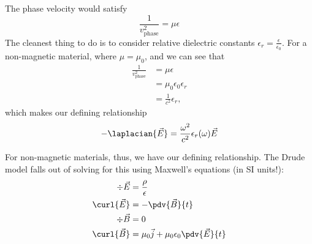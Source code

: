 \documentclass[../../main.tex]{subfiles}
\begin{document}
The phase velocity would satisfy 
\begin{equation}
	\frac{1}{v_{\textrm{phase}}^2} = \mu \epsilon
\end{equation}
The cleanest thing to do is to consider relative dielectric constants $\epsilon_r = \frac{\epsilon}{\epsilon_0}$. For a non-magnetic material, where $\mu = \mu_0$, and we can see that 
\begin{align}
	\frac{1}{v_{\textrm{phase}}^2} &= \mu \epsilon \\
	&= \mu_0 \epsilon_0 \epsilon_r \\
	&= \frac{1}{c^2} \epsilon_r,
\end{align}
which makes our defining relationship 
\begin{equation} \label{eq:DrudeTheory:DielectricDef}
	-\laplacian{\vec{E}} = \frac{\omega^2}{c^2} \epsilon_r(\omega) \vec{E}
\end{equation}

For non-magnetic materials, thus, we have our defining relationship. The Drude model falls out of solving for this using Maxwell's equations (in SI units!):
\begin{align}
	\div{\vec{E}} &= \frac{\rho}{\epsilon} \\
	\curl{\vec{E}} &= - \pdv{\vec{B}}{t} \\
	\div{\vec{B}} &= 0 \\
	\curl{\vec{B}} &= \mu_0 \vec{j} + \mu_0 \epsilon_0 \pdv{\vec{E}}{t}
\end{align}
\end{document}

